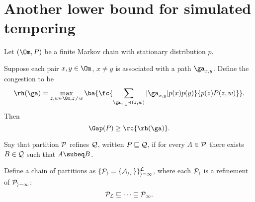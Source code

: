 \section{Another lower bound for simulated tempering}
\label{app:other}

\begin{thm}\label{thm:can-path}
Let $(\Om, P)$ be a finite Markov chain with stationary distribution $p$.

Suppose each pair $x,y\in \Om$, $x\ne y$ is associated with a path $\ga_{x,y}$. Define the congestion to be
$$
\rh(\ga) = \max_{z,w\in \Om, z\ne w} \ba{
\fc{\sum_{\ga_{x,y}\ni (z,w) }|\ga_{x,y}|p(x)p(y)}{p(z)P(z,w)}
}.
$$
Then
$$
\Gap(P) \ge \rc{\rh(\ga)}.
$$
\end{thm}

\begin{df}
Say that partition $\cal P$ refines $\cal Q$, written $P\sqsubseteq \cal Q$, if for every $A\in \cal P$ there exists $B\in \cal Q$ such that $A\subeq B$. 

Define a chain of partitions as $\{\cal P_i = \{A_{i,j}\}\}_{i=1}^{L}$, where each $\cal P_i$ is a refinement of $\cal P_{i-1}$:
$$
\cal P_{L} \sqsubseteq \cdots \sqsubseteq \cal P_1.
$$
\end{df}


